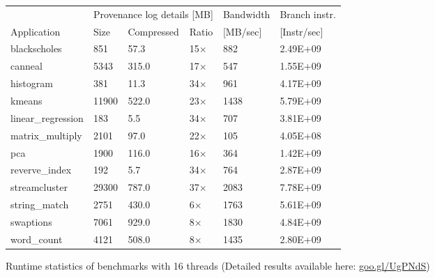 \begin{figure}[t]
\centering
\myfontsize
{
\begin{tabular}{m{1.3cm}|m{.6cm}|m{1.2cm}|m{0.8cm}|m{1.25cm}|m{1.25cm}}
       & \multicolumn{3}{c|}{ Provenance log details [MB] }   &  Bandwidth & Branch instr. \\
   { Application} & Size & Compressed & Ratio & [MB/sec] &  [Instr/sec] \\
  \hline \hline
    blackscholes & 851& 57.3 & 15$\times$& 882& 2.49E+09 \\
    canneal& 5343& 315.0 &  17$\times$& 547& 1.55E+09 \\
    histogram& 381& 11.3 & 34$\times$& 961& 4.17E+09 \\
    kmeans& 11900& 522.0 & 23$\times$& 1438& 5.79E+09 \\
    linear\_regression& 183& 5.5 & 34$\times$& 707& 3.81E+09 \\
    matrix\_multiply& 2101& 97.0 & 22$\times$& 105& 4.05E+08 \\
    pca& 1900& 116.0 & 16$\times$& 364& 1.42E+09 \\
    reverve\_index& 192& 5.7 & 34$\times$& 764& 2.87E+09 \\
    streamcluster& 29300& 787.0 & 37$\times$& 2083& 7.78E+09 \\
    string\_match& 2751& 430.0 & 6$\times$& 1763& 5.61E+09 \\
    swaptions& 7061& 929.0 & 8$\times$& 1830& 4.84E+09 \\
    word\_count& 4121& 508.0 & 8$\times$& 1435& 2.80E+09 \\

\hline
\end{tabular}
}

\caption{Runtime statistics of benchmarks with 16 threads (Detailed results available here: \href{https://goo.gl/UgPNdS}{goo.gl/UgPNdS}) }                                                                                                                                      \label{tab:apps}
\end{figure}
